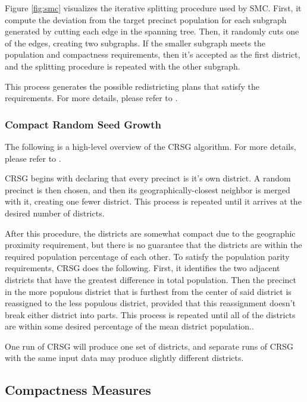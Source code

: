 Figure \ref{fig:smc} visualizes the iterative splitting procedure used by SMC. First, it compute the deviation from the target precinct population for each subgraph generated by cutting each edge in the spanning tree. Then, it randomly cuts one of the edges, creating two subgraphs. If the smaller subgraph meets the population and compactness requirements, then it's accepted as the first district, and the splitting procedure is repeated with the other subgraph. 

This process generates the possible redistricting plans that satisfy the requirements. For more details, please refer to \textcite{mccartan2020}.

\subsubsection{Compact Random Seed Growth}
\label{sec:crsg}

The following is a high-level overview of the CRSG algorithm. For more details, please refer to \textcite[249-50]{chen2013}.

CRSG begins with declaring that every precinct is it's own district. A random precinct is then chosen, and then its geographically-closest neighbor is merged with it, creating one fewer district. This process is repeated until it arrives at the desired number of districts. \parencite[249-50]{chen2013}

After this procedure, the districts are somewhat compact due to the geographic proximity requirement, but there is no guarantee that the districts are within the required population percentage of each other. To satisfy the population parity requirements, CRSG does the following. First, it identifies the two adjacent districts that have the greatest difference in total population. Then the precinct in the more populous district that is furthest from the center of said district is reassigned to the less populous district, provided that this reassignment doesn't break either district into parts. This process is repeated until all of the districts are within some desired percentage of the mean district population.\textcite[249-50]{chen2013}.

One run of CRSG will produce one set of districts, and separate runs of CRSG with the same input data may produce slightly different districts.

\subsection{Compactness Measures}

